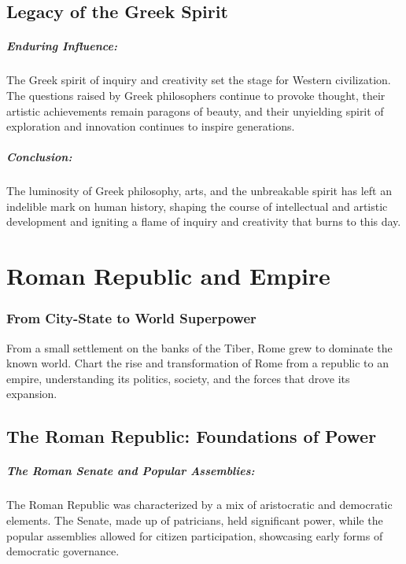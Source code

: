 \documentclass[a4paper,12pt]{book}
\begin{document}
\section*{Legacy of the Greek Spirit}

\paragraph{Enduring Influence:}
The Greek spirit of inquiry and creativity set the stage for Western civilization. The questions raised by Greek philosophers continue to provoke thought, their artistic achievements remain paragons of beauty, and their unyielding spirit of exploration and innovation continues to inspire generations.

\paragraph{Conclusion:}
The luminosity of Greek philosophy, arts, and the unbreakable spirit has left an indelible mark on human history, shaping the course of intellectual and artistic development and igniting a flame of inquiry and creativity that burns to this day.

\chapter{Roman Republic and Empire}
\subsection*{From City-State to World Superpower}
From a small settlement on the banks of the Tiber, Rome grew to dominate the known world. Chart the rise and transformation of Rome from a republic to an empire, understanding its politics, society, and the forces that drove its expansion.

\section*{The Roman Republic: Foundations of Power}

\paragraph{The Roman Senate and Popular Assemblies:}
The Roman Republic was characterized by a mix of aristocratic and democratic elements. The Senate, made up of patricians, held significant power, while the popular assemblies allowed for citizen participation, showcasing early forms of democratic governance.
\end{document}
